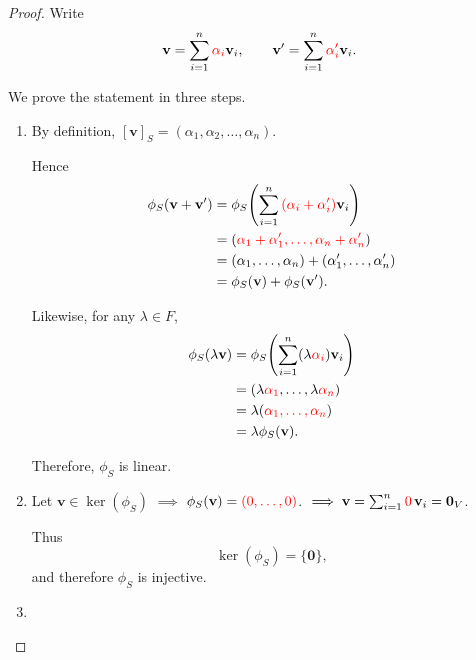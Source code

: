 \documentclass[12pt]{article}
\begin{document}
\begin{proof}
Write
\[
\mathbf{v}=\sum_{i=1}^n\textcolor{red}{\alpha_i}\mathbf{v}_i,\qquad\mathbf{v}'=\sum_{i=1}^n\textcolor{red}{\alpha_i'}\mathbf{v}_i.
\]

We prove the statement in three steps.

\begin{enumerate}
    \item {}

    By definition, $[\mathbf{v}]_S=(\alpha_1,\alpha_2,\ldots,\alpha_n)$.

    Hence
    \begin{align*}
    \phi_S(\mathbf{v}+\mathbf{v}')
        &=\phi_S\!\left(
        \sum_{i=1}^n\textcolor{red}{(\alpha_i+\alpha_i')}\mathbf{v}_i
        \right)                                                   \\
        &=(\textcolor{red}{\alpha_1+\alpha_1',\ldots,\alpha_n+\alpha_n'})   \\
        &=(\alpha_1,\ldots,\alpha_n)+(\alpha_1',\ldots,\alpha_n') \\
        &=\phi_S(\mathbf{v})+\phi_S(\mathbf{v}').
    \end{align*}

    Likewise, for any $\lambda\in F$,
    \begin{align*}
    \phi_S(\lambda\mathbf{v})
        &=\phi_S\!\left(
        \sum_{i=1}^n(\lambda\textcolor{red}{\alpha_i})\mathbf{v}_i
        \right)                                     \\
        &=(\lambda\textcolor{red}{\alpha_1},\ldots,\lambda\textcolor{red}{\alpha_n}) \\
        &=\lambda(\textcolor{red}{\alpha_1,\ldots,\alpha_n})   \\
        &=\lambda\phi_S(\mathbf{v}).
    \end{align*}

    Therefore, $\phi_S$ is linear.

    \item {}

    Let $\mathbf{v}\in\ker(\phi_S)$ $\implies$ $\phi_S(\mathbf{v})=\textcolor{red}{(0,\ldots,0)}$.
    $\implies\mathbf{v} =\sum_{i=1}^n\textcolor{red}{0}\,\mathbf{v}_i =\mathbf{0}_V$.

    Thus
    \[
    \ker(\phi_S)=\{\mathbf{0}\},
    \]
    and therefore $\phi_S$ is injective.

    \item {}


\end{enumerate}
\end{proof}
\end{document}

